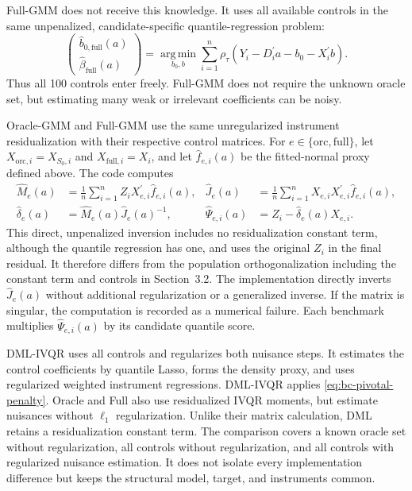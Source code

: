 Full-GMM does not receive this knowledge. It uses all available controls in the same unpenalized, candidate-specific quantile-regression problem:
\begin{equation}
    \begin{pmatrix}
        \widehat b_{0,\mathrm{full}}(a)\\
        \widehat\beta_{\mathrm{full}}(a)
    \end{pmatrix}
    =
    \operatorname*{arg\,min}_{b_0,b}
    \sum_{i=1}^{n}
    \rho_{\tau}\!\left(
        Y_i-D_i^{\prime}a-b_0-X_i^{\prime}b
    \right).
    \label{eq:full-beta}
\end{equation}
Thus all 100 controls enter freely. Full-GMM does not require the unknown oracle set, but estimating many weak or irrelevant coefficients can be noisy.

Oracle-GMM and Full-GMM use the same unregularized instrument residualization with their respective control matrices. For $e\in\{\mathrm{orc},\mathrm{full}\}$, let $X_{\mathrm{orc},i}=X_{S_0,i}$ and $X_{\mathrm{full},i}=X_i$, and let $\widehat f_{e,i}(a)$ be the fitted-normal proxy defined above. The code computes
\begin{equation}
    \begin{aligned}
        \widehat M_e(a)
        &=\frac{1}{n}\sum_{i=1}^{n}
          Z_iX_{e,i}^{\prime}\widehat f_{e,i}(a),&
        \widehat J_e(a)
        &=\frac{1}{n}\sum_{i=1}^{n}
          X_{e,i}X_{e,i}^{\prime}\widehat f_{e,i}(a),\\
        \widehat\delta_e(a)
        &=\widehat M_e(a)\widehat J_e(a)^{-1},&
        \widehat\Psi_{e,i}(a)
        &=Z_i-\widehat\delta_e(a)X_{e,i}.
    \end{aligned}
    \label{eq:benchmark-residualization}
\end{equation}
This direct, unpenalized inversion includes no residualization constant term, although the quantile regression has one, and uses the original $Z_i$ in the final residual. It therefore differs from the population orthogonalization including the constant term and controls in Section~3.2. The implementation directly inverts $\widehat J_e(a)$ without additional regularization or a generalized inverse. If the matrix is singular, the computation is recorded as a numerical failure. Each benchmark multiplies $\widehat\Psi_{e,i}(a)$ by its candidate quantile score.

DML-IVQR uses all controls and regularizes both nuisance steps. It estimates the control coefficients by quantile Lasso, forms the density proxy, and uses regularized weighted instrument regressions. DML-IVQR applies \eqref{eq:bc-pivotal-penalty}. Oracle and Full also use residualized IVQR moments, but estimate nuisances without $\ell_1$ regularization. Unlike their matrix calculation, DML retains a residualization constant term. The comparison covers a known oracle set without regularization, all controls without regularization, and all controls with regularized nuisance estimation. It does not isolate every implementation difference but keeps the structural model, target, and instruments common.

